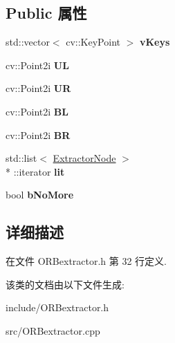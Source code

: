 \subsection*{Public 属性}
\begin{DoxyCompactItemize}
\item 
\hypertarget{classORB__SLAM2_1_1ExtractorNode_a34dda34415caa0e996148e53f8b174ce}{std\-::vector$<$ cv\-::\-Key\-Point $>$ {\bfseries v\-Keys}}\label{classORB__SLAM2_1_1ExtractorNode_a34dda34415caa0e996148e53f8b174ce}

\item 
\hypertarget{classORB__SLAM2_1_1ExtractorNode_a3f3ae5685a8a2b2cd42fbd08e7563c3d}{cv\-::\-Point2i {\bfseries U\-L}}\label{classORB__SLAM2_1_1ExtractorNode_a3f3ae5685a8a2b2cd42fbd08e7563c3d}

\item 
\hypertarget{classORB__SLAM2_1_1ExtractorNode_a73ec9b10c8a3f98ed70a117086bae12a}{cv\-::\-Point2i {\bfseries U\-R}}\label{classORB__SLAM2_1_1ExtractorNode_a73ec9b10c8a3f98ed70a117086bae12a}

\item 
\hypertarget{classORB__SLAM2_1_1ExtractorNode_ab31adc0d00b85307ba98b2ff434c30fc}{cv\-::\-Point2i {\bfseries B\-L}}\label{classORB__SLAM2_1_1ExtractorNode_ab31adc0d00b85307ba98b2ff434c30fc}

\item 
\hypertarget{classORB__SLAM2_1_1ExtractorNode_a8530a1f5934122f24382859c156a441d}{cv\-::\-Point2i {\bfseries B\-R}}\label{classORB__SLAM2_1_1ExtractorNode_a8530a1f5934122f24382859c156a441d}

\item 
\hypertarget{classORB__SLAM2_1_1ExtractorNode_a5301b76ea0e33bb066a46776810d742c}{std\-::list$<$ \hyperlink{classORB__SLAM2_1_1ExtractorNode}{Extractor\-Node} $>$\\*
\-::iterator {\bfseries lit}}\label{classORB__SLAM2_1_1ExtractorNode_a5301b76ea0e33bb066a46776810d742c}

\item 
\hypertarget{classORB__SLAM2_1_1ExtractorNode_ada60a6ca3a5874204dcb3245ac7d2d97}{bool {\bfseries b\-No\-More}}\label{classORB__SLAM2_1_1ExtractorNode_ada60a6ca3a5874204dcb3245ac7d2d97}

\end{DoxyCompactItemize}


\subsection{详细描述}


在文件 O\-R\-Bextractor.\-h 第 32 行定义.



该类的文档由以下文件生成\-:\begin{DoxyCompactItemize}
\item 
include/O\-R\-Bextractor.\-h\item 
src/O\-R\-Bextractor.\-cpp\end{DoxyCompactItemize}
